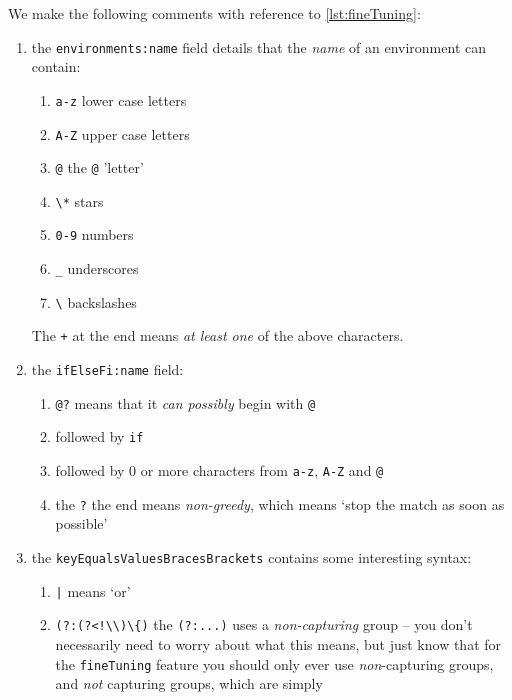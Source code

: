  We make the following comments with reference to \cref{lst:fineTuning}:
 \begin{enumerate}
	 \item the \texttt{environments:name} field details that the \emph{name} of an
	       environment can contain:
	       \begin{enumerate}
		       \item \texttt{a-z} lower case letters
		       \item \texttt{A-Z} upper case letters
		       \item \texttt{@} the \texttt{@} 'letter'
		       \item \lstinline!\*! stars
		       \item \texttt{0-9} numbers
		       \item \lstinline!_! underscores
		       \item \lstinline!\! backslashes
	       \end{enumerate}
	       The \texttt{+} at the end means \emph{at least one} of the above
	       characters.
	 \item the \texttt{ifElseFi:name} field:
	       \begin{enumerate}
		       \item \lstinline^@?^ means that it \emph{can possibly} begin with
		             \lstinline^@^
		       \item followed by \texttt{if}
		       \item followed by 0 or more characters from \texttt{a-z}, \texttt{A-Z} and
		             \texttt{@}
		       \item the \texttt{?} the end means \emph{non-greedy}, which means `stop the
		             match as soon as possible'
	       \end{enumerate}
	 \item the \texttt{keyEqualsValuesBracesBrackets} contains some interesting syntax:
	       \begin{enumerate}
		       \item \lstinline!|! means `or'
		       \item \lstinline^(?:(?<!\\)\{)^ the \lstinline^(?:...)^ uses a \emph{non-capturing} group --
		             you don't necessarily need to worry about what this means, but just know that for the
		             \texttt{fineTuning} feature you should only ever use \emph{non}-capturing
		             groups, and \emph{not} capturing groups, which are simply

\end{enumerate}
\end{enumerate}
